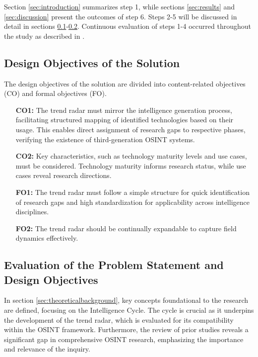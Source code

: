 \documentclass[10pt]{article}
\begin{document}
Section \ref{sec:introduction} summarizes step 1, while sections \ref{sec:results} and \ref{sec:discussion} present the outcomes of step 6. Steps 2-5 will be discussed in detail in sections \ref{sec:designobjectives}-\ref{sec:eval}. Continuous evaluation of steps 1-4 occurred throughout the study as described in \cite{Sonnenberg.2012}.


\subsection{Design Objectives of the Solution} \label{sec:designobjectives}


The design objectives of the solution are divided into content-related objectives (CO) and formal objectives (FO).

\begin{itemize}
    \item[\textbf{CO1:}] The trend radar must mirror the intelligence generation process, facilitating structured mapping of identified technologies based on their usage. This enables direct assignment of research gaps to respective phases, verifying the existence of third-generation OSINT systems.
    \item[\textbf{CO2:}] Key characteristics, such as technology maturity levels and use cases, must be considered. Technology maturity informs research status, while use cases reveal research directions.
    \item[\textbf{FO1:}] The trend radar must follow a simple structure for quick identification of research gaps and high standardization for applicability across intelligence disciplines.
    \item[\textbf{FO2:}] The trend radar should be continually expandable to capture field dynamics effectively.
\end{itemize}

\subsection{Evaluation of the Problem Statement and Design Objectives} \label{sec:eval}
In section \ref{sec:theoreticalbackground}, key concepts foundational to the research are defined, focusing on the Intelligence Cycle. The cycle is crucial as it underpins the development of the trend radar, which is evaluated for its compatibility within the OSINT framework. Furthermore, the review of prior studies reveals a significant gap in comprehensive OSINT research, emphasizing the importance and relevance of the inquiry.
\end{document}
